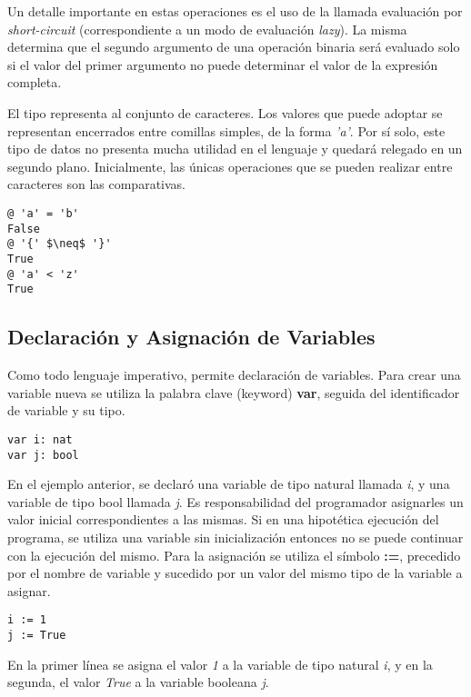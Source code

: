 \documentclass{article}
\begin{document}
Un detalle importante en estas operaciones es el uso de la llamada evaluación por \textit{short-circuit} (correspondiente a un modo de evaluación \textit{lazy}).
La misma determina que el segundo argumento de una operación binaria será evaluado solo si el valor del primer argumento no puede determinar el valor de la expresión completa.

El tipo  representa al conjunto de caracteres.
Los valores que puede adoptar se representan encerrados entre comillas simples, de la forma \textit{'a'}.
Por sí solo, este tipo de datos no presenta mucha utilidad en el lenguaje y quedará relegado en un segundo plano.
Inicialmente, las únicas operaciones que se pueden realizar entre caracteres son las comparativas.

\begin{lstlisting}
@ 'a' = 'b'
False
@ '{' $\neq$ '}'
True
@ 'a' < 'z'
True
\end{lstlisting}

\subsection{Declaración y Asignación de Variables}

Como todo lenguaje imperativo, \Lang\space permite declaración de variables.
Para crear una variable nueva se utiliza la palabra clave (keyword) \textbf{var}, seguida del identificador de variable y su tipo.

\begin{lstlisting}
var i: nat
var j: bool
\end{lstlisting}

En el ejemplo anterior, se declaró una variable de tipo natural llamada \textit{i}, y una variable de tipo bool llamada \textit{j}.
Es responsabilidad del programador asignarles un valor inicial correspondientes a las mismas.
Si en una hipotética ejecución del programa, se utiliza una variable sin inicialización entonces no se puede continuar con la ejecución del mismo.
Para la asignación se utiliza el símbolo \textbf{:=}, precedido por el nombre de variable y sucedido por un valor del mismo tipo de la variable a asignar.

\begin{lstlisting}
i := 1
j := True
\end{lstlisting}

En la primer línea se asigna el valor \textit{1} a la variable de tipo natural \textit{i}, y en la segunda, el valor \textit{True} a la variable booleana \textit{j}.
\end{document}
